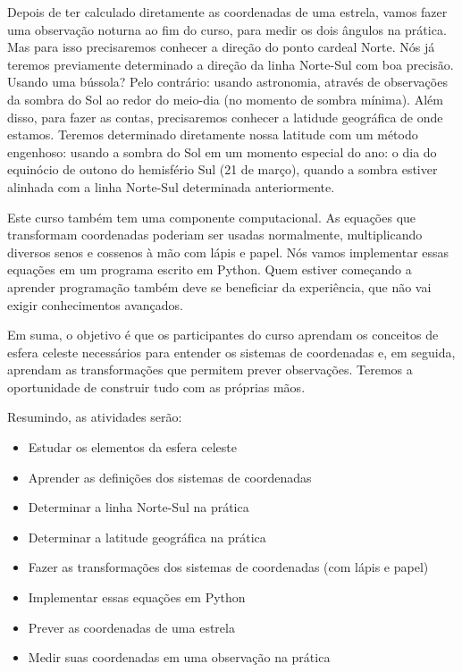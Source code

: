 Depois de ter calculado diretamente as coordenadas de uma estrela, vamos fazer uma observação noturna ao fim do curso, para medir os dois ângulos na prática. Mas para isso precisaremos conhecer a direção do ponto cardeal Norte. Nós já teremos previamente determinado a direção da linha Norte-Sul com boa precisão. Usando uma bússola? Pelo contrário: usando astronomia, através de observações da sombra do Sol ao redor do meio-dia (no momento de sombra mínima). Além disso, para fazer as contas, precisaremos conhecer a latidude geográfica de onde estamos. Teremos determinado diretamente nossa latitude com um método engenhoso: usando a sombra do Sol em um momento especial do ano: o dia do equinócio de outono do hemisfério Sul (21 de março), quando a sombra estiver alinhada com a linha Norte-Sul determinada anteriormente.

Este curso também tem uma componente computacional. As equações que transformam coordenadas poderiam ser usadas normalmente, multiplicando diversos senos e cossenos à mão com lápis e papel. Nós vamos implementar essas equações em um programa escrito em Python. Quem estiver começando a aprender programação também deve se beneficiar da experiência, que não vai exigir conhecimentos avançados.

Em suma, o objetivo é que os participantes do curso aprendam os conceitos de esfera celeste necessários para entender os sistemas de coordenadas e, em seguida, aprendam as transformações que permitem prever observações. Teremos a oportunidade de construir tudo com as próprias mãos.

Resumindo, as atividades serão:
\begin{itemize}
\setlength\itemsep{0.2em}
\item Estudar os elementos da esfera celeste
\item Aprender as definições dos sistemas de coordenadas
\item Determinar a linha Norte-Sul na prática
\item Determinar a latitude geográfica na prática
\item Fazer as transformações dos sistemas de coordenadas (com lápis e papel)
\item Implementar essas equações em Python
\item Prever as coordenadas de uma estrela
\item Medir suas coordenadas em uma observação na prática
\end{itemize}


